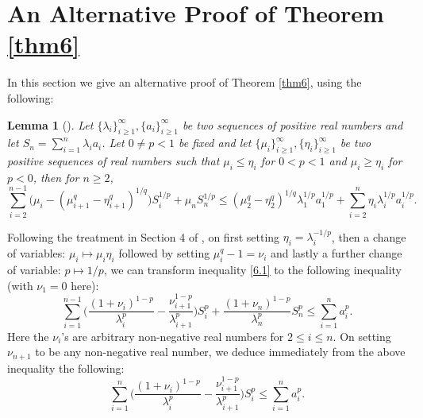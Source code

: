 \documentclass[11pt]{amsart}
\newtheorem{lemma}{Lemma}[section]
\numberwithin{equation}{section}
\theoremstyle{definition}
\theoremstyle{remark}
\begin{document}
\section{An Alternative Proof of Theorem \ref{thm6}}
\label{sec 3} \setcounter{equation}{0}
    In this section we give an alternative proof of Theorem \ref{thm6},
    using the following:
\begin{lemma}[{\cite[Lemma 2.4]{G}}]
\label{lem6.1}
  Let $\{ \lambda_i \}^{\infty}_{i \geq 1}, \{ a_i \}^{\infty}_{i \geq 1}$ be two sequences of positive real numbers and
  let $S_n=\sum_{i=1}^n \lambda_i
  a_i$. Let $0 \neq p<1$ be fixed and let $\{ \mu_i \}^{\infty}_{i \geq 1}, \{ \eta_i \}^{\infty}_{i \geq 1}$ be two
  positive sequences of real numbers such
  that $\mu_i \leq \eta_i$ for $0<p<1$ and $\mu_i \geq \eta_i$ for
  $p<0$, then for $n \geq 2$,
\begin{equation}
\label{6.1}
   \sum_{i=2}^{n-1}\Big ( \mu_i-(\mu^q_{i+1}-\eta^q_{i+1})^{1/q} \Big )S_i^{1/p}+\mu_nS_n^{1/p}
   \leq (\mu^q_{2}-\eta^q_{2})^{1/q}\lambda^{1/p}_1a_1^{1/p}
   +\sum_{i=2}^n \eta_i \lambda^{1/p}_i a_i^{1/p}.
\end{equation}
\end{lemma}

   Following the treatment in Section 4 of \cite{G6}, on first setting $\eta_i =
   \lambda^{-1/p}_i$, then a change of variables: $\mu_i \mapsto
   \mu_i\eta_i$ followed by setting $\mu^q_{i}-1=\nu_i$
   and lastly a further change of variable: $p \mapsto 1/p$, we
   can transform inequality \eqref{6.1} to the following inequality (with $\nu_1=0$ here):
\begin{equation*}
\label{6.2}
    \sum_{i=1}^{n-1}\Big ( \frac {(1+\nu_i)^{1-p}}{\lambda^{p}_i}-
   \frac {\nu^{1-p}_{i+1}}{\lambda^{p}_{i+1}} \Big )S_i^{p}+ \frac {(1+\nu_n)^{1-p}}{\lambda^{p}_n}S_n^{p}
   \leq \sum_{i=1}^n  a_i^{p}.
\end{equation*}
    Here the $\nu_i$'s are arbitrary non-negative real numbers for $2 \leq i \leq n$. On setting
    $\nu_{n+1}$ to be any non-negative real number, we deduce immediately from the above inequality the following:
\begin{equation}
\label{3.02}
    \sum_{i=1}^{n}\Big ( \frac {(1+\nu_i)^{1-p}}{\lambda^{p}_i}-
   \frac {\nu^{1-p}_{i+1}}{\lambda^{p}_{i+1}} \Big )S_i^{p} \leq \sum_{i=1}^n  a_i^{p}.
\end{equation}
\end{document}

